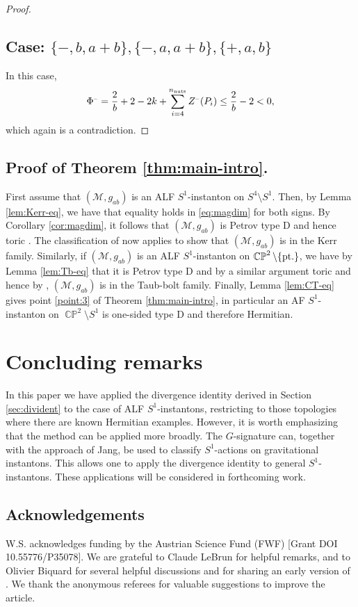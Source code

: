 \documentclass[a4paper,10pt,reqno]{amsart}
\newcommand{\nut}{P}
\newcommand{\cM}{\mathcal{M}}
\theoremstyle{plain}
\DeclareMathOperator{\CP}{\mathbb{C}\mathbb{P}}
\newcommand{\nnuts}{n_{\text{\rm nuts}}}
\newcommand{\M}[1]{{{#1}^{\hspace{-.5pt}\scaleto{-}{4pt}}}}
\numberwithin{equation}{section}
\begin{document}
\begin{proof}
\subsection*{Case: $\{-,b,a+b\},\{-,a,a+b\},\{+,a,b\}$}
In this case, 
\begin{align}
\M{\Phi}
= \frac{2}{b} +2-2k +\sum_{i=4}^{\nnuts}\M{Z}(\nut_i)
\leq \frac{2}{b}-2
<0,
\end{align}
which again is a contradiction.
\end{proof}


\subsection{Proof of Theorem \ref{thm:main-intro}.} 
First assume that $(\cM, g_{ab})$ is an ALF $S^1$-instanton on $S^4 \setminus S^1$. Then, by Lemma \ref{lem:Kerr-eq}, we have that equality holds in \eqref{eq:magdim} for both signs. By Corollary \ref{cor:magdim}, it follows that $(\cM, g_{ab})$ is Petrov type D and hence toric \cite{2013arXiv1302.6975A}. The classification of \cite{Biquard:Gauduchon} now applies to show that $(\cM, g_{ab})$ is in the Kerr family. Similarly, if $(\cM, g_{ab})$ is an ALF $S^1$-instanton on $\CP^2 \setminus \{\text{\rm pt.}\}$, we have by Lemma \ref{lem:Tb-eq} that it is Petrov type D and by a similar argument toric and hence by \cite{Biquard:Gauduchon}, $(\cM, g_{ab})$ is in the Taub-bolt family. Finally, Lemma \ref{lem:CT-eq} gives point \ref{point:3} of Theorem \ref{thm:main-intro}, in particular an AF $S^1$-instanton on $\CP^2\setminus S^1$ is one-sided type D and therefore Hermitian. 

%
\section{Concluding remarks} 
%

In this paper we have applied the divergence identity derived in Section \ref{sec:divident} to the case of ALF $S^1$-instantons, restricting to those topologies where there are known Hermitian examples. However, it is worth emphasizing that the method can be applied more broadly. The $G$-signature  can, together with the approach of Jang, be used to classify $S^1$-actions on gravitational instantons. This allows one to apply the divergence identity to general $S^1$-instantons. These applications will be considered in forthcoming work. 

\subsection*{Acknowledgements}
W.S. acknowledges funding by the Austrian Science Fund (FWF) [Grant DOI 10.55776/P35078]. We are grateful to Claude LeBrun for helpful remarks, and to Olivier Biquard for several helpful discussions and for sharing an early version of \cite{Biquard:Gauduchon}. We thank the anonymous referees for valuable suggestions to improve the article. 
\end{document}
